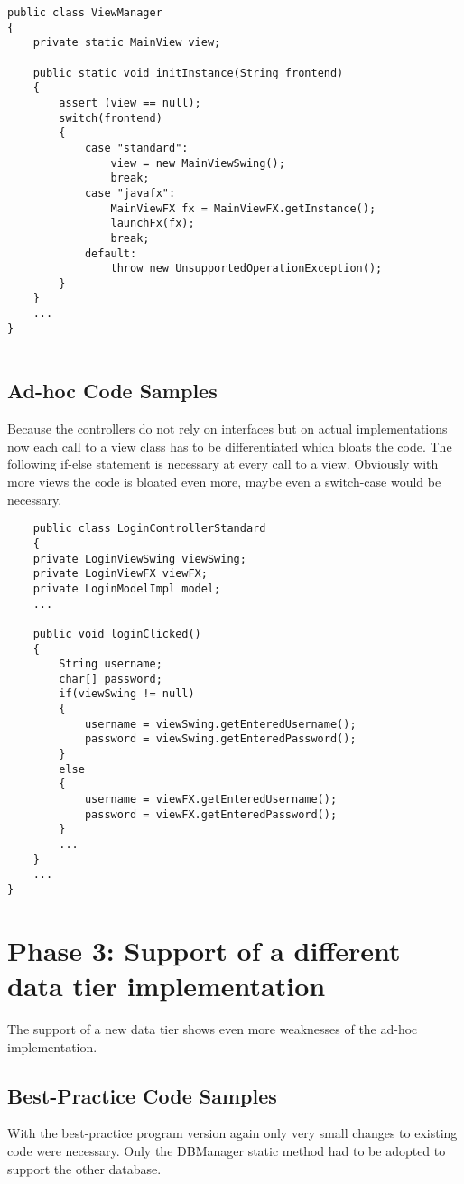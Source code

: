 \begin{lstlisting}
public class ViewManager
{
	private static MainView view;
	
	public static void initInstance(String frontend)
	{
		assert (view == null);
		switch(frontend)
		{
			case "standard":
				view = new MainViewSwing();
				break;
			case "javafx":
				MainViewFX fx = MainViewFX.getInstance();
				launchFx(fx);
				break;
			default:
				throw new UnsupportedOperationException();
		}
	}
	...
}
	
\end{lstlisting}

\subsection{Ad-hoc Code Samples}
\label{sec:ad-hoc-javafx}
Because the controllers do not rely on interfaces but on actual implementations now each call to a view class has to be differentiated which bloats the code. The following if-else statement is necessary at every call to a view. Obviously with more views the code is bloated even more, maybe even a switch-case would be necessary.

\begin{lstlisting}
	public class LoginControllerStandard
	{
	private LoginViewSwing viewSwing;
	private LoginViewFX viewFX;
	private LoginModelImpl model;
	...
	
	public void loginClicked()
	{
		String username;
		char[] password;
		if(viewSwing != null)
		{
			username = viewSwing.getEnteredUsername();
			password = viewSwing.getEnteredPassword();
		}
		else
		{
			username = viewFX.getEnteredUsername();
			password = viewFX.getEnteredPassword();
		}
		...
	}
	...
}
\end{lstlisting}


\section{Phase 3: Support of a different data tier implementation}
The support of a new data tier shows even more weaknesses of the ad-hoc implementation.

\subsection{Best-Practice Code Samples}
With the best-practice program version again only very small changes to existing code were necessary. Only the DBManager static method had to be adopted to support the other database.

